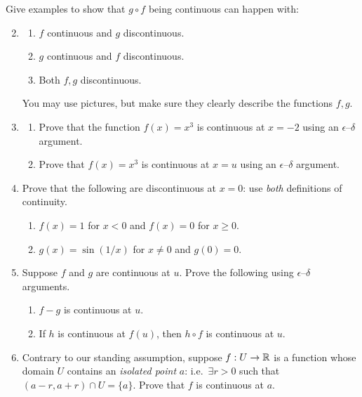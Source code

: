 \begin{exercises}
\exstart Give examples to show that $g\circ f$ being continuous can happen with:\vspace{-5pt}
\begin{enumerate}\setcounter{enumi}{1}  
  \item[]\begin{enumerate}
    \item $f$ continuous and $g$ discontinuous.
    \item $g$ continuous and $f$ discontinuous.
    \item Both $f,g$ discontinuous.
  \end{enumerate}
  You may use pictures, but make sure they clearly describe the functions $f,g$.
  
  \item\begin{enumerate}
  	\item Prove that the function $f(x)=x^3$ is continuous at $x=-2$ using an $\epsilon$--$\delta$ argument.
  	\item Prove that $f(x)=x^3$ is continuous at $x=u$ using an $\epsilon$--$\delta$ argument.
  \end{enumerate}

	\item Prove that the following are discontinuous at $x=0$: use \emph{both} definitions of continuity.
	\begin{enumerate}
  	\item $f(x)=1$ for $x<0$ and $f(x)=0$ for $x\ge 0$.
  	\item $g(x)=\sin(1/x)$ for $x\neq 0$ and $g(0)=0$.
	\end{enumerate}

	\item Suppose $f$ and $g$ are continuous at $u$. Prove the following using $\epsilon$--$\delta$ arguments.
	\begin{enumerate}
  	\item $f-g$ is continuous at $u$.
  	\item If $h$ is continuous at $f(u)$, then $h\circ f$ is continuous at $u$.
	\end{enumerate}
  
  \item\label{exs:isolatedcont} Contrary to our standing assumption, suppose $f:U\to \mathbb{R}$ is a function whose domain $U$ contains an \emph{isolated point} $a$: i.e.\ $\exists r>0$ such that $(a-r,a+r)\cap U=\{a\}$. Prove that $f$ is continuous at $a$.
  

\end{enumerate}
\end{exercises}
